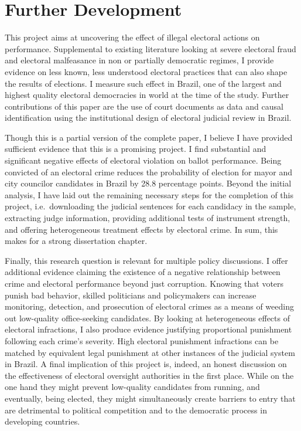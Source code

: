 \documentclass[11pt]{article}
\begin{document}
\section{Further Development} \label{sec:conclusion_paper1}

This project aims at uncovering the effect of illegal electoral actions on performance. Supplemental to existing literature looking at severe electoral fraud and electoral malfeasance in non or partially democratic regimes, I provide evidence on less known, less understood electoral practices that can also shape the results of elections. I measure such effect in Brazil, one of the largest and highest quality electoral democracies in world at the time of the study. Further contributions of this paper are the use of court documents as data and causal identification using the institutional design of electoral judicial review in Brazil.

Though this is a partial version of the complete paper, I believe I have provided sufficient evidence that this is a promising project. I find substantial and significant negative effects of electoral violation on ballot performance. Being convicted of an electoral crime reduces the probability of election for mayor and city councilor candidates in Brazil by 28.8 percentage points. Beyond the initial analysis, I have laid out the remaining necessary steps for the completion of this project, i.e.~downloading the judicial sentences for each candidacy in the sample, extracting judge information, providing additional tests of instrument strength, and offering heterogeneous treatment effects by electoral crime. In sum, this makes for a strong dissertation chapter.

Finally, this research question is relevant for multiple policy discussions. I offer additional evidence claiming the existence of a negative relationship between crime and electoral performance beyond just corruption. Knowing that voters punish bad behavior, skilled politicians and policymakers can increase monitoring, detection, and prosecution of electoral crimes as a means of weeding out low-quality office-seeking candidates. By looking at heterogeneous effects of electoral infractions, I also produce evidence justifying proportional punishment following each crime's severity. High electoral punishment infractions can be matched by equivalent legal punishment at other instances of the judicial system in Brazil. A final implication of this project is, indeed, an honest discussion on the effectiveness of electoral oversight authorities in the first place. While on the one hand they might prevent low-quality candidates from running, and eventually, being elected, they might simultaneously create barriers to entry that are detrimental to political competition and to the democratic process in developing countries.
\end{document}
